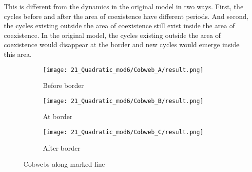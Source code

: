 This is different from the dynamics in the original model in two ways.
First, the cycles before and after the area of coexistence have different periods.
And second, the cycles existing outside the area of coexistence still exist inside the area of coexistence.
In the original model, the cycles existing outside the area of coexistence would disappear at the border and new cycles would emerge inside this area.

\begin{figure}
    \centering
    \begin{subfigure}{0.3\textwidth}
        \centering
        \texttt{[image: 21\_Quadratic\_mod6/Cobweb\_A/result.png]}
        \caption{Before border}
        \label{fig:quad.full.CobwebA}
    \end{subfigure}
    \begin{subfigure}{0.3\textwidth}
        \centering
        \texttt{[image: 21\_Quadratic\_mod6/Cobweb\_B/result.png]}
        \caption{At border}
        \label{fig:quad.full.CobwebB}
    \end{subfigure}
    \begin{subfigure}{0.3\textwidth}
        \centering
        \texttt{[image: 21\_Quadratic\_mod6/Cobweb\_C/result.png]}
        \caption{After border}
        \label{fig:quad.full.CobwebC}
    \end{subfigure}
    \caption{Cobwebs along marked line}
    \label{fig:quad.full.Cobwebs}
\end{figure}
